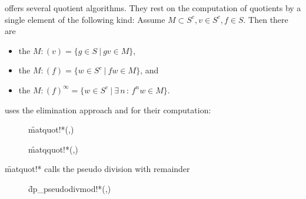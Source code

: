  offers several quotient algorithms. They rest on the computation
of quotients by a single element of the following kind: Assume
$M\subset S^c, v\in S^c, f\in S$. Then there are
\begin{itemize}
  \item[]
the  $M : (v) = \{g\in S\ |\ gv\in M\}$,
  \item[]
the  $M : (f) = \{w\in S^c\ |\ fw\in M\}$, and
  \item[]
the  $M : (f)^\infty = \{w\in S^c\ |\ \exists\,
n\, :\, f^nw\in M\}$.
\end{itemize}
 uses the elimination approach \cite[4.4.]{Cox:92} and
\cite[6.38]{Becker:93} for their computation:
\begin{description}

\item[]
  \begin{syntax}
    \f{matquot!*}(,)
  \end{syntax}
  \hypertarget{procedure:MATQUOT!*}{}

\item[]
  \begin{syntax}
    \f{matqquot!*}(,)
  \end{syntax}
  \hypertarget{procedure:MATQQUOT!*}{}
\end{description}
\f{matquot!*} calls the pseudo division with remainder
\begin{description}

\item[]
  \begin{syntax}
    \f{dp\_pseudodivmod!*}(,)
  \end{syntax}
  \hypertarget{procedure:DP_PSEUDODIVMOD!*}{}
\end{description}
\medskip

